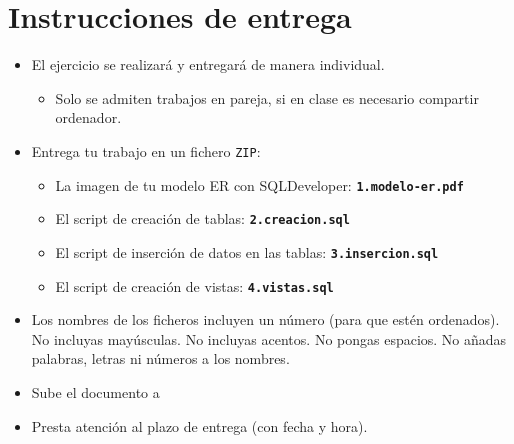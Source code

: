 \section{Instrucciones de entrega}
\begin{itemize}
\item El ejercicio se realizará y entregará de manera individual.
  \begin{itemize}
  \item Solo se admiten trabajos en pareja, si en clase es necesario compartir ordenador.
  \end{itemize}
\item Entrega tu trabajo en un fichero \texttt{ZIP}:
  \begin{itemize}
  \item La imagen de tu modelo ER  con SQLDeveloper: \texttt{\textbf{1.modelo-er.pdf}}
  \item El script de creación de tablas: \texttt{\textbf{2.creacion.sql}}
  \item El script de inserción de datos en las tablas: \texttt{\textbf{3.insercion.sql}}
  \item El script de creación de vistas: \texttt{\textbf{4.vistas.sql}}
  \end{itemize}
\item Los nombres de los ficheros incluyen un número (para que estén ordenados). No incluyas mayúsculas. No incluyas acentos. No pongas espacios. No añadas palabras, letras ni números a los nombres.
\item Sube el documento a 
\item Presta atención al plazo de entrega (con fecha y hora).
  
\end{itemize}





